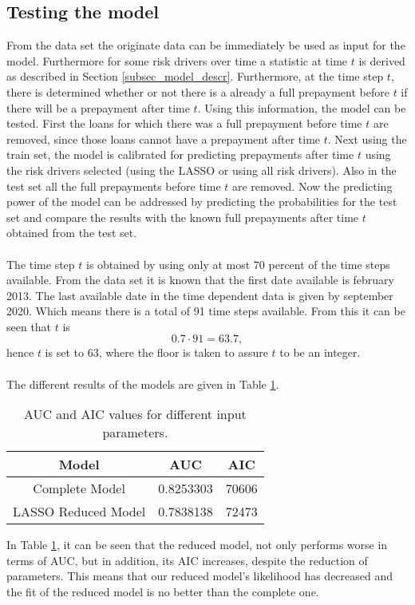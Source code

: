 \subsection{Testing the model}
    From the data set the originate data can be immediately be used 
    as input for the model. Furthermore for some risk drivers over time 
    a statistic at time $t$ is derived as described in Section 
    \ref{subsec_model_descr}. Furthermore, at the time step $t$, 
    there is determined whether or not there is a already a full prepayment 
    before $t$ if there will be a prepayment after time $t$. Using this 
    information, the model can be tested. First the loans for 
    which there was a full prepayment before time $t$ are removed, 
    since those loans cannot have a prepayment after time $t$. 
    Next using the train set, the model is calibrated for 
    predicting prepayments after time $t$ using the risk drivers 
    selected (using the LASSO or using all risk drivers). 
    Also in the test set all the full prepayments before time 
    $t$ are removed. Now the predicting power of the model 
    can be addressed by predicting the probabilities for the test set 
    and compare the results with the known full prepayments after time 
    $t$ obtained from the test set.
    \\\\
    The time step $t$ is obtained by using only at most 70 percent 
    of the time steps available. From the data set it is known that 
    the first date available is february 2013. The last available
    date in the time dependent data is given by september 2020. 
    Which means there is a total of 91 time steps available. 
    From this it can be seen that $t$ is
    \begin{equation}
        0.7 \cdot 91 = 63.7,
    \end{equation}
    hence $t$ is set to 63, where the floor is taken to assure 
    $t$ to be an integer.
    \\\\
    The different results of the models are given in Table 
    \ref{ModelAICandAUC}.
    \begin{table}[H]
        \centering
            \begin{tabular}{c|c|c}
            Model & AUC & AIC \\\hline
            Complete Model & 0.8253303 & 70606\\
            LASSO Reduced Model &  0.7838138 & 72473\\
            
            \end{tabular}
            \caption{AUC and AIC values for different input parameters.}
            \label{ModelAICandAUC}
    \end{table}    
    In Table \ref{ModelAICandAUC}, it can be seen that the 
    reduced model, not only performs worse in terms of AUC, 
    but in addition, its AIC increases, despite the reduction 
    of parameters. This means that our reduced model's 
    likelihood has decreased and the fit of the reduced model is no better 
    than the complete one.

